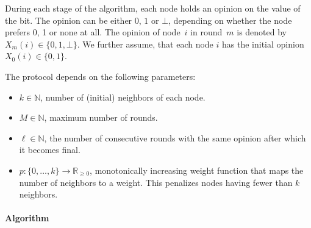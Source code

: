 \documentclass[../main.tex]{subfiles}
\begin{document}
During each stage of the algorithm, each node holds an opinion on the value of the bit.
The opinion can be either $0$, $1$ or $\bot$, depending on whether the node prefers 0, 1 or none at all.
The opinion of node~$i$ in round~$m$ is denoted by~$X_m(i) \in \{0,1, \bot\}$. 
We further assume, that each node $i$ has the initial opinion $X_0(i) \in \{0,1\}$.

The protocol depends on the following parameters:
\begin{itemize}
	\item $k \in \mathbb{N}$, number of (initial) neighbors of each node.
	\item $M \in \mathbb{N}$, maximum number of rounds.
	\item $\ell \in \mathbb{N}$, the number of consecutive rounds with the same opinion after which it becomes final.
	\item $p : \{0,\dots,k\} \to \mathbb{R}_{\geq 0}$, monotonically increasing weight function that maps the number of neighbors to a weight. This penalizes nodes having fewer than $k$ neighbors.
\end{itemize}

\paragraph{Algorithm}
\end{document}
